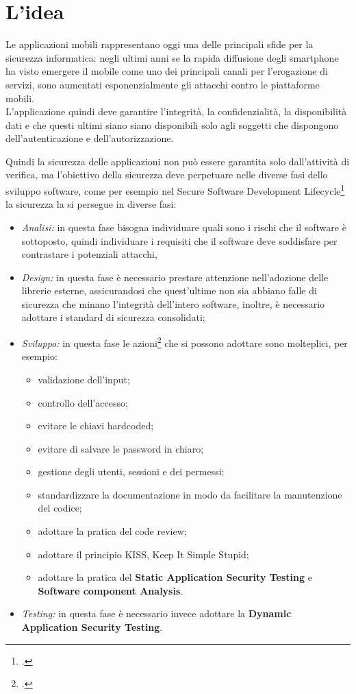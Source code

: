 \section{L'idea}\label{sec:l'idea}

Le applicazioni mobili rappresentano oggi una delle principali sfide per la sicurezza informatica: negli ultimi anni se la rapida diffusione degli smartphone ha visto emergere il mobile come uno dei principali canali per l'erogazione di servizi, sono aumentati esponenzialmente gli attacchi contro le piattaforme mobili.\\
L'applicazione quindi deve garantire l'integrità, la confidenzialità, la disponibilità dati e che questi ultimi siano siano disponibili solo agli soggetti che dispongono dell'autenticazione e dell'autorizzazione.

Quindi la sicurezza delle applicazioni non può essere garantita solo dall'attività di verifica, ma l'obiettivo della sicurezza deve perpetuare nelle diverse fasi dello sviluppo software, come per esempio nel Secure Software Development Lifecycle\footcite{site:ssdl} la sicurezza la si persegue in diverse fasi:
\begin{itemize}
    \item \textit{Analisi:} in questa fase bisogna individuare quali sono i rischi che il software è sottoposto, quindi individuare i requisiti che il software deve soddisfare per contrastare i potenziali attacchi,
    \item \textit{Design:} in questa fase è necessario prestare attenzione nell'adozione delle librerie esterne, assicurandosi che quest'ultime non sia abbiano falle di sicurezza che minano l'integrità dell'intero software, inoltre, è necessario adottare i standard di sicurezza consolidati;
    \item \textit{Sviluppo:} in questa fase le azioni\footcite{site:security-best-practice} che si possono adottare sono molteplici, per esempio:
    \begin{itemize}
        \item validazione dell'input;
        \item controllo dell'accesso;
        \item evitare le chiavi hardcoded;
        \item evitare di salvare le password in chiaro;
        \item gestione degli utenti, sessioni e dei permessi;
        \item standardizzare la documentazione in modo da facilitare la manutenzione del codice;
        \item adottare la pratica del code review;
        \item adottare il principio KISS, Keep It Simple Stupid;
        \item adottare la pratica del \textbf{Static Application Security Testing} e \textbf{Software component Analysis}.
    \end{itemize}
    \item \textit{Testing:} in questa fase è necessario invece adottare la \textbf{Dynamic Application Security Testing}.
\end{itemize}

